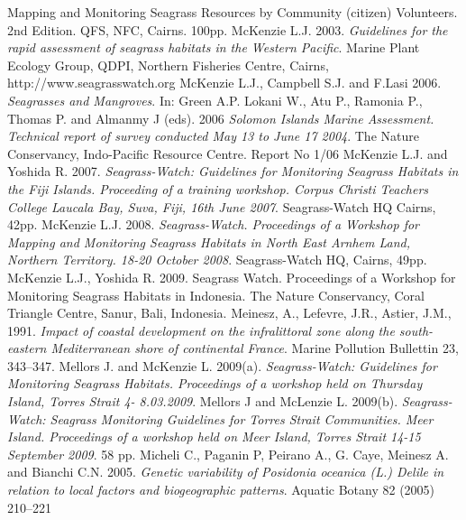 \documentclass[10pt, a4paper]{article}
\begin{document}
\begin{thebibliography}{999}
{Mapping and Monitoring Seagrass Resources by Community (citizen) Volunteers}. 2nd
Edition. QFS, NFC, Cairns. 100pp. \pageref{McKenzie03}
McKenzie L.J. 2003. \emph{Guidelines for the rapid assessment of seagrass habitats in the
Western Pacific}. Marine Plant Ecology Group, QDPI, Northern Fisheries Centre, Cairns,
http://www.seagrasswatch.org \pageref{McKenzieetal03}
McKenzie L.J., Campbell S.J. and F.Lasi 2006. \emph{Seagrasses and Mangroves}. In: Green
A.P. Lokani W., Atu P., Ramonia P., Thomas P. and Almanmy J (eds). 2006 \emph{Solomon
Islands Marine Assessment. Technical report of survey conducted May 13 to June 17 2004}.
The Nature Conservancy, Indo-Pacific Resource Centre. Report No 1/06 \pageref{McKenzie06}
McKenzie L.J. and Yoshida R. 2007. \emph{Seagrass-Watch: Guidelines for Monitoring
Seagrass Habitats in the Fiji Islands. Proceeding of a training workshop. Corpus Christi
Teachers College Laucala Bay, Suva, Fiji, 16th June 2007}. Seagrass-Watch HQ Cairns, 42pp. \pageref{McKenzie07}
McKenzie L.J. 2008. \emph{Seagrass-Watch. Proceedings of a Workshop for Mapping and
Monitoring Seagrass Habitats in North East Arnhem Land, Northern Territory. 18-20
October 2008}. Seagrass-Watch HQ, Cairns, 49pp. \pageref{McKenzie08}
McKenzie L.J., Yoshida R. 2009. Seagrass Watch. Proceedings of a Workshop for
Monitoring Seagrass Habitats in Indonesia. The Nature Conservancy, Coral Triangle
Centre, Sanur, Bali, Indonesia. \pageref{McKenzie09}
Meinesz, A., Lefevre, J.R., Astier, J.M., 1991. \emph{Impact of coastal development on the
infralittoral zone along the south-eastern Mediterranean shore of continental France}.
Marine Pollution Bullettin 23, 343–347. \pageref{Meinesz91}
Mellors J. and McKenzie L. 2009(a). \emph{Seagrass-Watch: Guidelines for Monitoring
Seagrass Habitats. Proceedings of a workshop held on Thursday Island, Torres Strait 4-
8.03.2009}. \pageref{Mellors09a}
Mellors J and McLenzie L. 2009(b). \emph{Seagrass-Watch: Seagrass Monitoring Guidelines
for Torres Strait Communities. Meer Island. Proceedings of a workshop held on Meer
Island, Torres Strait 14-15 September 2009}. 58 pp. \pageref{Mellors09b}
Micheli C., Paganin P, Peirano A., G. Caye, Meinesz A. and Bianchi C.N. 2005. \emph{Genetic
variability of \textit{Posidonia oceanica} (L.) Delile in relation to local factors and biogeographic
patterns}. Aquatic Botany 82 (2005) 210–221 \pageref{Micheli05}

\end{thebibliography}
\end{document}
